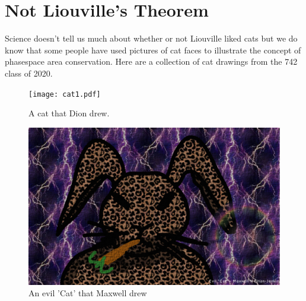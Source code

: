 \section{Not Liouville's Theorem}
Science doesn't tell us much about whether or not Liouville liked cats but we do know that some people have used pictures of cat faces to illustrate the concept of phasespace area conservation. 
Here are a collection of cat drawings from the 742 class of 2020.

\begin{centering}
\begin{figure}
	\texttt{[image: cat1.pdf]}
  \caption{A cat that Dion drew.}
  \label{fig:cat1}
\end{figure}
\begin{figure}
	\includegraphics[width=12cm]{catto.pdf}
  \caption{An evil 'Cat' that Maxwell drew}
  \label{fig:catto}
\end{figure}
\end{centering}



\clearpage
